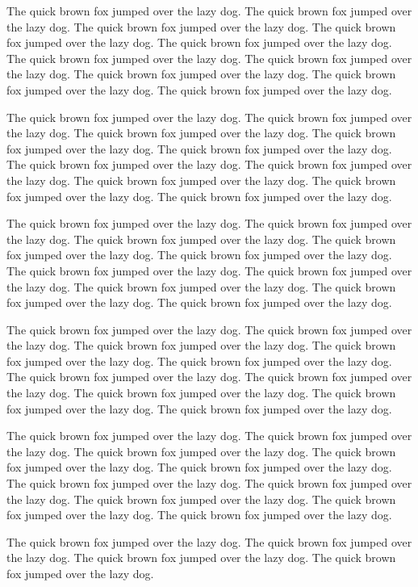 \documentclass[12pt]{article}
\begin{document}
The quick brown fox jumped over the lazy dog. The quick brown fox jumped
over the lazy dog. The quick brown fox jumped over the lazy dog. The
quick brown fox jumped over the lazy dog. The quick brown fox jumped
over the lazy dog. The quick brown fox jumped over the lazy dog. The
quick brown fox jumped over the lazy dog. The quick brown fox jumped
over the lazy dog. The quick brown fox jumped over the lazy dog. The
quick brown fox jumped over the lazy dog.

The quick brown fox jumped over the lazy dog. The quick brown fox jumped
over the lazy dog. The quick brown fox jumped over the lazy dog. The
quick brown fox jumped over the lazy dog. The quick brown fox jumped
over the lazy dog. The quick brown fox jumped over the lazy dog. The
quick brown fox jumped over the lazy dog. The quick brown fox jumped
over the lazy dog. The quick brown fox jumped over the lazy dog. The
quick brown fox jumped over the lazy dog.

The quick brown fox jumped over the lazy dog. The quick brown fox jumped
over the lazy dog. The quick brown fox jumped over the lazy dog. The
quick brown fox jumped over the lazy dog. The quick brown fox jumped
over the lazy dog. The quick brown fox jumped over the lazy dog. The
quick brown fox jumped over the lazy dog. The quick brown fox jumped
over the lazy dog. The quick brown fox jumped over the lazy dog. The
quick brown fox jumped over the lazy dog.

The quick brown fox jumped over the lazy dog. The quick brown fox jumped
over the lazy dog. The quick brown fox jumped over the lazy dog. The
quick brown fox jumped over the lazy dog. The quick brown fox jumped
over the lazy dog. The quick brown fox jumped over the lazy dog. The
quick brown fox jumped over the lazy dog. The quick brown fox jumped
over the lazy dog. The quick brown fox jumped over the lazy dog. The
quick brown fox jumped over the lazy dog.

The quick brown fox jumped over the lazy dog. The quick brown fox jumped
over the lazy dog. The quick brown fox jumped over the lazy dog. The
quick brown fox jumped over the lazy dog. The quick brown fox jumped
over the lazy dog. The quick brown fox jumped over the lazy dog. The
quick brown fox jumped over the lazy dog. The quick brown fox jumped
over the lazy dog. The quick brown fox jumped over the lazy dog. The
quick brown fox jumped over the lazy dog.

The quick brown fox jumped over the lazy dog. The quick brown fox jumped
over the lazy dog. The quick brown fox jumped over the lazy dog. The
quick brown fox jumped over the lazy dog.
\end{document}
